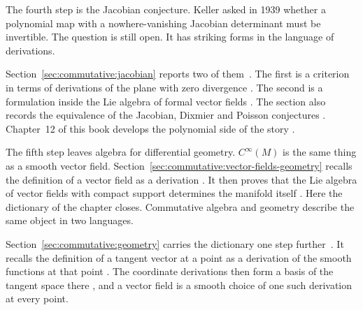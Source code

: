 The fourth step is the Jacobian conjecture. Keller asked in 1939 whether a
polynomial map with a nowhere-vanishing Jacobian determinant must be
invertible. The question is still open. It has striking forms in the language
of derivations.

Section~\ref{sec:commutative:jacobian} reports two of them~\cite[p.~101]{VanEssenKurodaKoenig2021}. The first is a
criterion in terms of derivations of the plane with zero divergence
\cite[Example~5.2.14, pp.~130--131]{VanEssenKurodaKoenig2021}. The second is a
formulation inside the Lie algebra of formal vector fields
\cite[Proposition~1, p.~211]{HauserMuller1998}. The section also records the
equivalence of the Jacobian, Dixmier and Poisson conjectures
\cite[Theorem~4.4.1, p.~91]{VanEssenKurodaKoenig2021}. Chapter~12 of this
book develops the polynomial side of the story
\cite[p.~101]{VanEssenKurodaKoenig2021}.

The fifth step leaves algebra for differential geometry.
$C^\infty(M)$ is the same thing as a smooth vector field.
Section~\ref{sec:commutative:vector-fields-geometry} recalls the definition of
a vector field as a derivation \cite[p.~122]{Nestruev2020}. It then proves
that the Lie algebra of vector fields with compact support determines the
manifold itself \cite[Theorem~3, p.~471]{ShanksPursell1954}. Here the
dictionary of the chapter closes. Commutative algebra and geometry describe
the same object in two languages.

Section~\ref{sec:commutative:geometry} carries the dictionary one step
further~\cite[equation (2.19), p.~70]{MajumdarBhattacharyya2023}. It recalls the definition of a tangent vector at a point as a
derivation of the smooth functions at that point
\cite[p.~70]{MajumdarBhattacharyya2023}. The coordinate derivations then form
a basis of the tangent space there
\cite[equation (2.19), p.~70]{MajumdarBhattacharyya2023}, and a vector field
is a smooth choice of one such derivation at every point.
